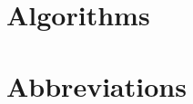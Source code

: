 \begin{appendices}
\cleardoublepage

\chapter{Algorithms}
\label{app-algorithms}



\chapter{Abbreviations}
\label{app-abbreviations}

\end{appendices}